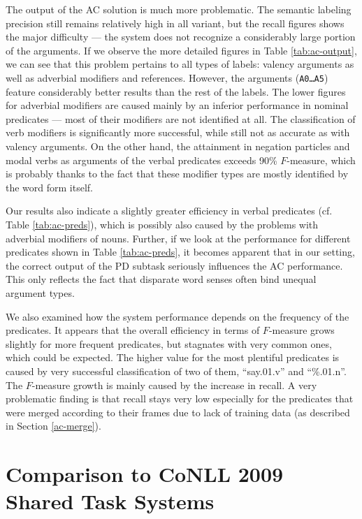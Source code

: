 \documentclass[12pt,notitlepage]{report}
\begin{document}
The output of the AC solution is much more problematic. The semantic labeling precision still remains relatively high in all variant, but the recall figures shows the major difficulty --- the system does not recognize a considerably large portion of the arguments. If we observe the more detailed figures in Table \ref{tab:ac-output}, we can see that this problem pertains to all types of labels: valency arguments as well as adverbial modifiers and references. However, the arguments (\texttt{A0\dots A5}) feature considerably better results than the rest of the labels. The lower figures for adverbial modifiers are caused mainly by an inferior performance in nominal predicates --- most of their modifiers are not identified at all. The classification of verb modifiers is significantly more successful, while still not as accurate as with valency arguments. On the other hand, the attainment in negation particles and modal verbs as arguments of the verbal predicates exceeds 90\% $F$-measure, which is probably thanks to the fact that these modifier types are mostly identified by the word form itself.

Our results also indicate a slightly greater efficiency in verbal predicates (cf. Table \ref{tab:ac-preds}), which is possibly also caused by the problems with adverbial modifiers of nouns. Further, if we look at the performance for different predicates shown in Table \ref{tab:ac-preds}, it becomes apparent that in our setting, the correct output of the PD subtask seriously influences the AC performance. This only reflects the fact that disparate word senses often bind unequal argument types.

We also examined how the system performance depends on the frequency of the predicates. It appears that the overall efficiency in terms of $F$-measure grows slightly for more frequent predicates, but stagnates with very common ones, which could be expected. The higher value for the most plentiful predicates is caused by very successful classification of two of them, ``say.01.v'' and ``\%.01.n''. The $F$-measure growth is mainly caused by the increase in recall. A very problematic finding is that recall stays very low especially for the predicates that were merged according to their frames due to lack of training data (as described in Section \ref{ac-merge}).

\section{Comparison to CoNLL 2009 Shared Task Systems}\label{comparison}
\end{document}
